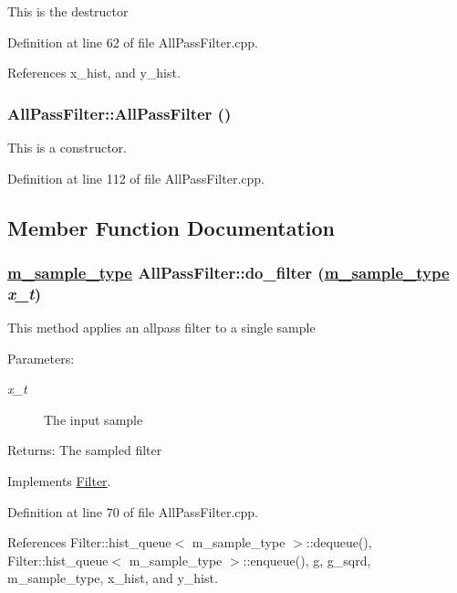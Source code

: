 This is the destructor 

Definition at line 62 of file All\-Pass\-Filter.cpp.

References x\_\-hist, and y\_\-hist.\hypertarget{classAllPassFilter_a5}{
\subsubsection[AllPassFilter]{\setlength{\rightskip}{0pt plus 5cm}All\-Pass\-Filter::All\-Pass\-Filter ()}}
\label{classAllPassFilter_a5}


This is a constructor. 

Definition at line 112 of file All\-Pass\-Filter.cpp.

\subsection{Member Function Documentation}
\hypertarget{classAllPassFilter_a2}{
\subsubsection[do\_\-filter]{\setlength{\rightskip}{0pt plus 5cm}\hyperlink{Types_8h_a0}{m\_\-sample\_\-type} All\-Pass\-Filter::do\_\-filter (\hyperlink{Types_8h_a0}{m\_\-sample\_\-type} {\em x\_\-t})}}
\label{classAllPassFilter_a2}


This method applies an allpass filter to a single sample \begin{Desc}
\item[Parameters:]
\begin{description}
\item[{\em x\_\-t}]The input sample \end{description}
\end{Desc}
\begin{Desc}
\item[Returns:]The sampled filter \end{Desc}


Implements \hyperlink{classFilter_a3}{Filter}.

Definition at line 70 of file All\-Pass\-Filter.cpp.

References Filter::hist\_\-queue$<$ m\_\-sample\_\-type $>$::dequeue(), Filter::hist\_\-queue$<$ m\_\-sample\_\-type $>$::enqueue(), g, g\_\-sqrd, m\_\-sample\_\-type, x\_\-hist, and y\_\-hist.

